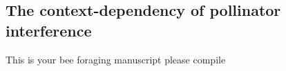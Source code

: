 \begin{refsection}
\chapter{The context-dependency of pollinator interference} %
\label{Bee_foraging}

This is your bee foraging manuscript please compile

\end{refsection}
